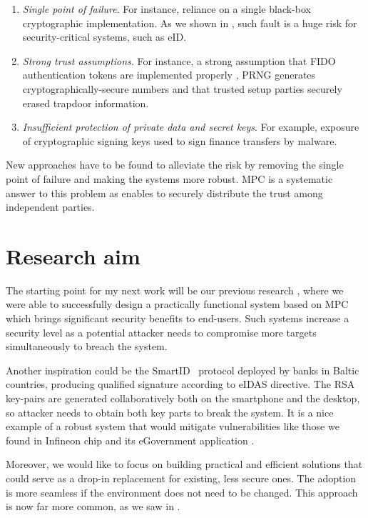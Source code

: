 \documentclass[
  digital, %
  twoside, %
  table,   %
  lof,     %
  lot,     %
]{fithesis3}
\theoremstyle{definition}
\theoremstyle{remark}
\begin{document}
\begin{enumerate}
	\item \emph{Single point of failure}. For instance, reliance on a single black-box cryptographic implementation. As we shown in \cite{2017-ccs-nemec}, such fault is a huge risk for security-critical systems, such as eID.
	
	\item \emph{Strong trust assumptions}. For instance, a strong assumption that FIDO authentication tokens are implemented properly \cite{DCMBR18}, PRNG generates cryptographically-secure numbers and that trusted setup parties securely erased trapdoor information.
	
	\item \emph{Insufficient protection of private data and secret keys}. 
	For example, exposure of cryptographic signing keys used to sign finance transfers by malware.
\end{enumerate}
 
New approaches have to be found to alleviate the risk by removing the single point of failure and making the systems more robust. MPC is a systematic answer to this problem as enables to securely distribute the trust among independent parties.

\section{Research aim}
The starting point for my next work will be our previous research \cite{2017-ccs-mavroudis}, where we were able to successfully design a practically functional system based on MPC which brings significant security benefits to end-users. Such systems increase a security level as a potential attacker needs to compromise more targets simultaneously to breach the system. 

Another inspiration could be the SmartID~\cite{smart_id_ee} protocol deployed by banks in Baltic countries, producing qualified signature according to eIDAS directive. The RSA key-pairs are generated collaboratively both on the smartphone and the desktop, so attacker needs to obtain both key parts to break the system. It is a nice example of a robust system that would mitigate vulnerabilities like those we found in Infineon chip and its eGovernment application \cite{2017-ccs-nemec}. 

Moreover, we would like to focus on building practical and efficient solutions that could serve as a drop-in replacement for existing, less secure ones. 
The adoption is more seamless if the environment does not need to be changed.
This approach is now far more common, as we saw in \cite{smart_id_ee, DCMBR18}. %
\end{document}
